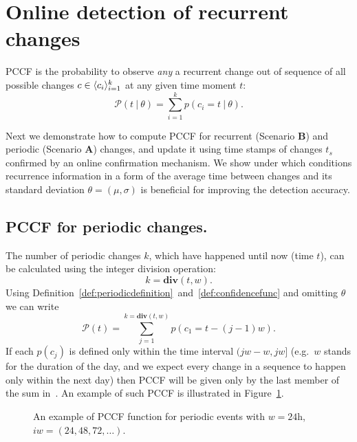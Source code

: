 \section{Online detection of recurrent changes}
\label{sec:predictionprocess}
\begin{definition}
\label{def:confidencefunc}
PCCF is the probability to observe \textit{any} a recurrent change out of sequence of all possible changes $c \in \langle  c_i  \rangle_{i=1}^k$ at any given time moment $t$:
\begin{equation}
\mathcal{P}(t \: | \: \theta) = \sum_{i=1}^{k} p(c_i = t \: | \: \theta).
\end{equation}
\end{definition}
Next we demonstrate how to compute PCCF for recurrent (Scenario \textbf{B}) and periodic (Scenario \textbf{A}) changes, and update it using time stamps of changes $t_s$ confirmed by an online confirmation mechanism.
We show under which conditions recurrence information in a form of the average time between changes and its standard deviation $\theta = (\mu, \sigma)$ is beneficial for improving the detection accuracy.

\subsection{PCCF for periodic changes.}
The number of periodic changes $k$, which have happened until now (time $t$), can be calculated using the integer division operation:
\begin{equation}
k = \mathbf{ div }(t,w).
\end{equation}
Using Definition~\ref{def:periodicdefinition}~and~\ref{def:confidencefunc} and omitting $\theta$ we can write
\begin{equation}
\mathcal{P}(t) = \sum_{j=1}^{k = \mathbf{div}(t,w)} p(c_1 = t - (j-1) w).
\label{eq:pccf_periodic}
\end{equation}
If each $p(c_j)$ is defined only within the time interval $(jw-w, j w]$
(e.g.\ $w$ stands for the duration of the day, and we expect every change in a sequence to happen only within the next day) then PCCF will be given only by the last member of the sum in~.
An example of such PCCF is illustrated in Figure~\ref{fig:periodicexample}.
\begin{figure}[htb!]
\centering

\caption{
An example of PCCF function for periodic events with $w=24$h, $i w = (24, 48, 72, \dots)$.}
\label{fig:periodicexample}
\end{figure}

